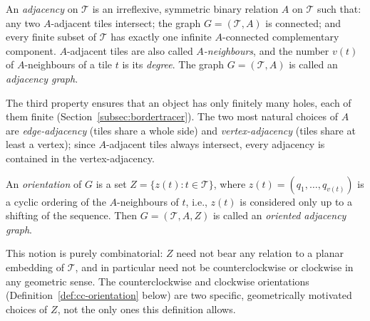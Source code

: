 \begin{definition}\label{def:adjacency}
    An \emph{adjacency} on $\mathcal{T}$ is an irreflexive, symmetric binary relation $A$ on $\mathcal{T}$ such that: any two $A$-adjacent tiles intersect; the graph $G=(\mathcal{T},A)$ is connected; and every finite subset of $\mathcal{T}$ has exactly one infinite $A$-connected complementary component.
    $A$-adjacent tiles are also called \emph{$A$-neighbours}, and the number $v(t)$ of $A$-neighbours of a tile $t$ is its \emph{degree}.
    The graph $G=(\mathcal{T}, A)$ is called an \emph{adjacency graph}.
\end{definition}

\begin{remark}
    The third property ensures that an object has only finitely many holes, each of them finite (Section~\ref{subsec:bordertracer}).
    The two most natural choices of $A$ are \emph{edge-adjacency} (tiles share a whole side) and \emph{vertex-adjacency} (tiles share at least a vertex); since $A$-adjacent tiles always intersect, every adjacency is contained in the vertex-adjacency.
\end{remark}

\begin{definition}\label{def:orientation}
    An \emph{orientation} of $G$ is a set $Z=\{z(t):t\in\mathcal{T}\}$, where $z(t)=(q_1,\dots,q_{v(t)})$ is a cyclic ordering of the $A$-neighbours of $t$, i.e., $z(t)$ is considered only up to a shifting of the sequence.
    Then $G=(\mathcal{T}, A, Z)$ is called an \emph{oriented adjacency graph}.
\end{definition}

\begin{remark}
    This notion is purely combinatorial: $Z$ need not bear any relation to a planar embedding of $\mathcal{T}$, and in particular need not be counterclockwise or clockwise in any geometric sense.
    The counterclockwise and clockwise orientations (Definition~\ref{def:cc-orientation} below) are two specific, geometrically motivated choices of $Z$, not the only ones this definition allows.
\end{remark}

